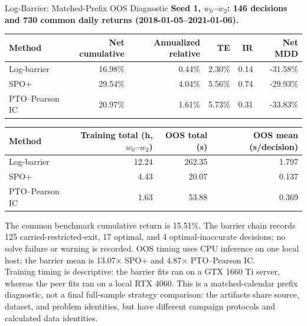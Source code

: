 \documentclass[aspectratio=169,xcolor=dvipsnames]{beamer}
\begin{document}
\begin{frame}{Log-Barrier: Matched-Prefix OOS Diagnostic}
    \small
    \textbf{Seed 1, $w_0$--$w_2$: 146 decisions and 730 common daily returns
    (2018-01-05--2021-01-06).}
    \vspace{3pt}
    \begin{table}
    \centering\scriptsize\setlength{\tabcolsep}{5pt}
    \begin{tabular}{l r r r r r}
    \toprule
    Method & Net cumulative & Annualized relative & TE & IR & Net MDD \\
    \midrule
    Log-barrier & 16.98\% & 0.44\% & 2.30\% & 0.14 & -31.58\% \\
    SPO+ & 29.54\% & 4.04\% & 5.56\% & 0.74 & -29.93\% \\
    PTO--Pearson IC & 20.97\% & 1.61\% & 5.73\% & 0.31 & -33.83\% \\
    \bottomrule
    \end{tabular}
    \end{table}
    \vspace{1pt}
    \begin{table}
    \centering\scriptsize\setlength{\tabcolsep}{7pt}
    \begin{tabular}{l r r r}
    \toprule
    Method & Training total (h, $w_0$--$w_2$) & OOS total (s) & OOS mean (s/decision) \\
    \midrule
    Log-barrier & 12.24 & 262.35 & 1.797 \\
    SPO+ & 4.43 & 20.07 & 0.137 \\
    PTO--Pearson IC & 1.63 & 53.88 & 0.369 \\
    \bottomrule
    \end{tabular}
    \end{table}
    \vspace{2pt}
    \scriptsize
    The common benchmark cumulative return is 15.51\%. The barrier chain records
    125 carried-restricted-exit, 17 optimal, and 4 optimal-inaccurate decisions;
    no solve failure or warning is recorded. OOS timing uses CPU inference on one
    local host; the barrier mean is 13.07$\times$ SPO+ and 4.87$\times$ PTO--Pearson IC.\\[2pt]
    Training timing is descriptive: the barrier fits ran on a GTX 1660 Ti server,
    whereas the peer fits ran on a local RTX 4060. This is a matched-calendar
    prefix diagnostic, not a final full-sample strategy comparison: the artifacts
    share source, dataset, and problem identities, but have different campaign
    protocols and calculated data identities.
\end{frame}
\end{document}
